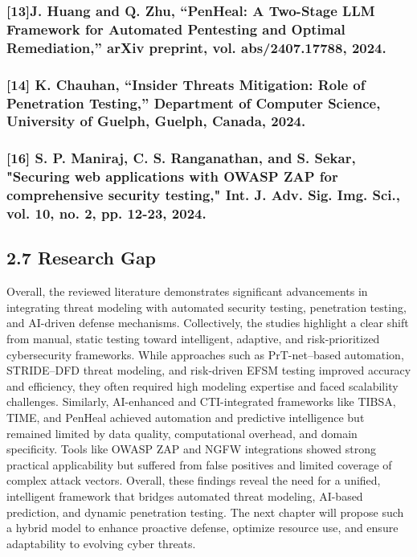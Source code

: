 \documentclass[12pt,a4paper]{report}
\begin{document}
\subsubsection{[13]J. Huang and Q. Zhu, “PenHeal: A Two-Stage LLM Framework for Automated Pentesting and Optimal Remediation,” arXiv preprint, vol. abs/2407.17788, 2024.}

\subsubsection{[14]  K. Chauhan, “Insider Threats Mitigation: Role of Penetration Testing,” Department of Computer Science, University of Guelph, Guelph, Canada, 2024.}

\subsubsection{[16] S. P. Maniraj, C. S. Ranganathan, and S. Sekar, "Securing web applications with OWASP ZAP for comprehensive security testing," Int. J. Adv. Sig. Img. Sci., vol. 10, no. 2, pp. 12-23, 2024.}

\subsection{2.7 Research Gap}

Overall, the reviewed literature demonstrates significant advancements in integrating threat modeling with automated security testing, penetration testing, and AI-driven defense mechanisms. Collectively, the studies highlight a clear shift from manual, static testing toward intelligent, adaptive, and risk-prioritized cybersecurity frameworks. While approaches such as PrT-net–based automation, STRIDE–DFD threat modeling, and risk-driven EFSM testing improved accuracy and efficiency, they often required high modeling expertise and faced scalability challenges. Similarly, AI-enhanced and CTI-integrated frameworks like TIBSA, TIME, and PenHeal achieved automation and predictive intelligence but remained limited by data quality, computational overhead, and domain specificity. Tools like OWASP ZAP and NGFW integrations showed strong practical applicability but suffered from false positives and limited coverage of complex attack vectors. Overall, these findings reveal the need for a unified, intelligent framework that bridges automated threat modeling, AI-based prediction, and dynamic penetration testing. The next chapter will propose such a hybrid model to enhance proactive defense, optimize resource use, and ensure adaptability to evolving cyber threats.
\end{document}
